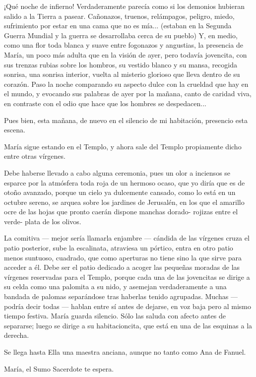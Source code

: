 \documentclass[12pt, twoside, openright]{book} %
\begin{document}
¡Qué noche de infierno! Verdaderamente parecía como si los demonios hubieran salido a la Tierra a pasear. Cañonazos, truenos, relámpagos, peligro, miedo, sufrimiento por estar en una cama que no es mía... (estaban en la Segunda Guerra Mundial y la guerra se desarrollaba cerca de su pueblo) Y, en medio, como una flor toda blanca y suave entre fogonazos y angustias, la presencia de María, un poco más adulta que en la visión de ayer, pero todavía jovencita, con sus trenzas rubias sobre los hombros, su vestido blanco y su mansa, recogida sonrisa, una sonrisa interior, vuelta al misterio glorioso que lleva dentro de su corazón. Paso la noche comparando su aspecto dulce con la crueldad que hay en el mundo, y evocando sus palabras de ayer por la mañana, canto de caridad viva, en contraste con el odio que hace que los hombres se despedacen... 

Pues bien, esta mañana, de nuevo en el silencio de mi habitación, presencio esta escena. 

María sigue estando en el Templo, y ahora sale del Templo propiamente dicho entre otras vírgenes. 

Debe haberse llevado a cabo alguna ceremonia, pues un olor a inciensos se esparce por la atmósfera toda roja de un hermoso ocaso, que yo diría que es de otoño avanzado, porque un cielo ya dulcemente cansado, como lo está en un octubre sereno, se arquea sobre los jardines de Jerusalén, en los que el amarillo ocre de las hojas que pronto caerán dispone manchas dorado- rojizas entre el verde- plata de los olivos. 

La comitiva — mejor sería llamarla enjambre — cándida de las vírgenes cruza el patio posterior, sube la escalinata, atraviesa un pórtico, entra en otro patio menos suntuoso, cuadrado, que como aperturas no tiene sino la que sirve para acceder a él. Debe ser el patio dedicado a acoger las pequeñas moradas de las vírgenes reservadas para el Templo, porque cada una de las jovencitas se dirige a su celda como una palomita a su nido, y asemejan verdaderamente a una bandada de palomas separándose tras haberlas tenido agrupadas. Muchas — podría decir todas — hablan entre sí antes de dejarse, en voz baja pero al mismo tiempo festiva. María guarda silencio. Sólo las saluda con afecto antes de separarse; luego se dirige a su habitacioncita, que está en una de las esquinas a la derecha. 

Se llega hasta Ella una maestra anciana, aunque no tanto como Ana de Fanuel. 

María, el Sumo Sacerdote te espera. 
\end{document}
